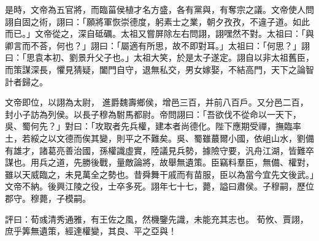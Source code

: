 \begin{pinyinscope}
 
 
 
 是時，文帝為五官將，而臨菑侯植才名方盛，各有黨與，有奪宗之議。文帝使人問詡自固之術，詡曰：「願將軍恢崇德度，躬素士之業，朝夕孜孜，不違子道。如此而已。」文帝從之，深自砥礪。太祖又嘗屏除左右問詡，詡嘿然不對。太祖曰：「與卿言而不荅，何也？」詡曰：「屬適有所思，故不即對耳。」太祖曰：「何思？」詡曰：「思袁本初、劉景升父子也。」太祖大笑，於是太子遂定。詡自以非太祖舊臣，而策謀深長，懼見猜疑，闔門自守，退無私交，男女嫁娶，不結高門，天下之論智計者歸之。
 
 
文帝即位，以詡為太尉，
 進爵魏壽鄉侯，增邑三百，并前八百戶。又分邑二百，封小子訪為列侯。以長子穆為駙馬都尉。帝問詡曰：「吾欲伐不從命以一天下，吳、蜀何先？」對曰：「攻取者先兵權，建本者尚德化。陛下應期受禪，撫臨率土，若綏之以文德而俟其變，則平之不難矣。吳、蜀雖蕞爾小國，依岨山水，劉備有雄才，諸葛亮善治國，孫權識虛實，陸議見兵勢，據險守要，汎舟江湖，皆難卒謀也。用兵之道，先勝後戰，量敵論將，故舉無遺策。臣竊料羣臣，無備、權對，雖以天威臨之，未見萬全之勢也。昔舜舞干戚而有苗服，臣以為當今宜先文後武。」文帝不納。後興江陵之役，士卒多死。詡年七十七，薨，謚曰肅侯。子穆嗣，歷位郡守。穆薨，子模嗣。
 
 
評曰：荀彧清秀通雅，有王佐之風，然機鑒先識，未能充其志也。
 荀攸、賈詡，庶乎筭無遺策，經達權變，其良、平之亞與！
 
 
\end{pinyinscope}